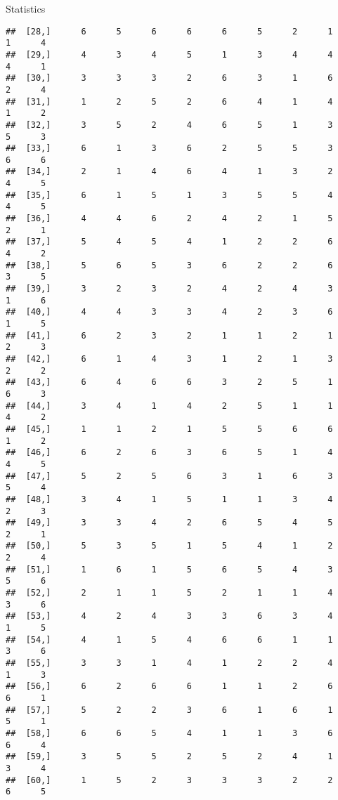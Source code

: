 \documentclass[
  ignorenonframetext,
]{beamer}
\begin{document}
\begin{frame}[fragile]{Statistics}
\begin{verbatim}
##  [28,]      6      5      6      6      6      5      2      1      1      4
##  [29,]      4      3      4      5      1      3      4      4      4      1
##  [30,]      3      3      3      2      6      3      1      6      2      4
##  [31,]      1      2      5      2      6      4      1      4      1      2
##  [32,]      3      5      2      4      6      5      1      3      5      3
##  [33,]      6      1      3      6      2      5      5      3      6      6
##  [34,]      2      1      4      6      4      1      3      2      4      5
##  [35,]      6      1      5      1      3      5      5      4      4      5
##  [36,]      4      4      6      2      4      2      1      5      2      1
##  [37,]      5      4      5      4      1      2      2      6      4      2
##  [38,]      5      6      5      3      6      2      2      6      3      5
##  [39,]      3      2      3      2      4      2      4      3      1      6
##  [40,]      4      4      3      3      4      2      3      6      1      5
##  [41,]      6      2      3      2      1      1      2      1      2      3
##  [42,]      6      1      4      3      1      2      1      3      2      2
##  [43,]      6      4      6      6      3      2      5      1      6      3
##  [44,]      3      4      1      4      2      5      1      1      4      2
##  [45,]      1      1      2      1      5      5      6      6      1      2
##  [46,]      6      2      6      3      6      5      1      4      4      5
##  [47,]      5      2      5      6      3      1      6      3      5      4
##  [48,]      3      4      1      5      1      1      3      4      2      3
##  [49,]      3      3      4      2      6      5      4      5      2      1
##  [50,]      5      3      5      1      5      4      1      2      2      4
##  [51,]      1      6      1      5      6      5      4      3      5      6
##  [52,]      2      1      1      5      2      1      1      4      3      6
##  [53,]      4      2      4      3      3      6      3      4      1      5
##  [54,]      4      1      5      4      6      6      1      1      3      6
##  [55,]      3      3      1      4      1      2      2      4      1      3
##  [56,]      6      2      6      6      1      1      2      6      6      1
##  [57,]      5      2      2      3      6      1      6      1      5      1
##  [58,]      6      6      5      4      1      1      3      6      6      4
##  [59,]      3      5      5      2      5      2      4      1      3      4
##  [60,]      1      5      2      3      3      3      2      2      6      5

\end{verbatim}
\end{frame}
\end{document}
